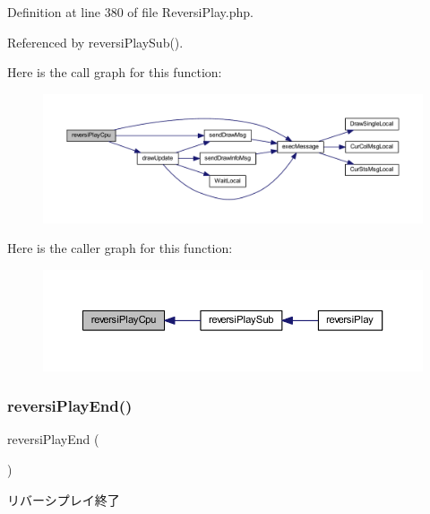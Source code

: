 Definition at line 380 of file Reversi\+Play.\+php.



Referenced by reversi\+Play\+Sub().

Here is the call graph for this function\+:
\nopagebreak
\begin{figure}[H]
\begin{center}
\leavevmode
\includegraphics[width=350pt]{class_reversi_play_a6514ad9244af720ee1ec1777c11e80fb_cgraph}
\end{center}
\end{figure}
Here is the caller graph for this function\+:
\nopagebreak
\begin{figure}[H]
\begin{center}
\leavevmode
\includegraphics[width=350pt]{class_reversi_play_a6514ad9244af720ee1ec1777c11e80fb_icgraph}
\end{center}
\end{figure}
\mbox{\label{class_reversi_play_af55fe6b6f2005c7da80c696ed692783d}} 
\subsubsection{\texorpdfstring{reversi\+Play\+End()}{reversiPlayEnd()}}
{\footnotesize\ttfamily reversi\+Play\+End (\begin{DoxyParamCaption}{ }\end{DoxyParamCaption})}



リバーシプレイ終了 

